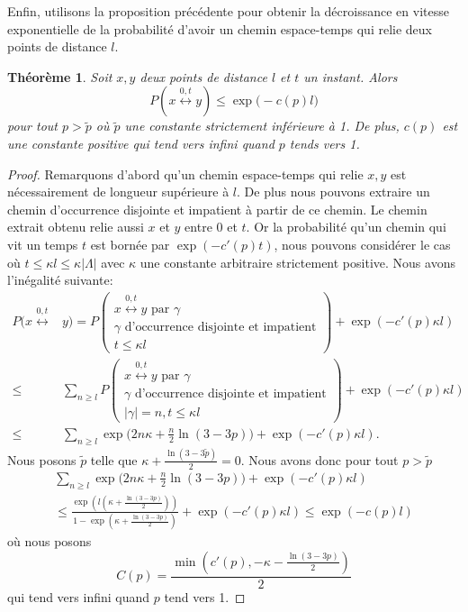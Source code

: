 \documentclass[titlepage,a4paper,12pt]{article}
\newcounter{d}
\newcounter{t}
\newcounter{p}
\newcounter{c}
\newcounter{a}
\newcounter{l}
\newtheorem{thm}[t]{Théorème}
\begin{document}
Enfin, utilisons la proposition précédente pour obtenir la décroissance en vitesse exponentielle de la probabilité d'avoir un chemin espace-temps qui relie deux points de distance $l$.
\begin{thm} Soit $x,y$ deux points de distance $l$ et $t$ un instant. Alors 
$$P(x\overset{0,t}{\longleftrightarrow} y)\leqslant \exp\big(-c(p)l\big)
$$pour tout $p > \tilde{p}$ où $\tilde{p}$ une constante strictement inférieure à 1. De plus, $c(p)$ est une constante positive qui tend vers infini quand $p$ tends vers 1.
\end{thm}
\begin{proof}
Remarquons d'abord qu'un chemin espace-temps qui relie $x,y$ est nécessairement de longueur supérieure à $l$. De plus nous pouvons extraire un chemin d'occurrence disjointe et impatient à partir de ce chemin. Le chemin extrait obtenu relie aussi $x$ et $y$ entre $0$ et $t$. Or la probabilité qu'un chemin qui vit un temps $t$ est bornée par $\exp(-c'(p)t)$, nous pouvons considérer le cas où $t\leqslant \kappa l \leqslant \kappa |\Lambda|$ avec $\kappa$ une constante arbitraire strictement positive.  Nous avons l'inégalité suivante:
\begin{align*}
P(x\overset{0,t}{\longleftrightarrow}& y)=P\left(\begin{array}{c}x\overset{0,t}{\longleftrightarrow} y\text{ par }\gamma\\\gamma \text{ d'occurrence disjointe et impatient}\\ t \leqslant \kappa l\end{array}\right) + \exp(-c'(p)\kappa l)\\
\leqslant& \sum_{n\geqslant l}P\left(\begin{array}{c}x\overset{0,t}{\longleftrightarrow} y\text{ par }\gamma\\\gamma \text{ d'occurrence disjointe et impatient}\\ |\gamma| = n, t \leqslant \kappa l\end{array}\right) + \exp(-c'(p)\kappa l)\\
\leqslant& \sum_{n\geqslant l} \exp\big(2n\kappa+\frac{n}{2}\ln(3-3p)\big) + \exp(-c'(p)\kappa l).
\end{align*}
Nous posons $\tilde{p}$ telle que $\kappa+\frac{\ln(3-3\tilde{p})}{2} = 0$. Nous avons donc pour tout $p>\tilde{p}$
\begin{multline*} \sum_{n\geqslant l} \exp\big(2n\kappa+\frac{n}{2}\ln(3-3p)\big) + \exp(-c'(p)\kappa l) \\
\leqslant \frac{\exp(l(\kappa+\frac{\ln(3-3p)}{2}))}{1-\exp(\kappa+\frac{\ln(3-3p)}{2})}+\exp(-c'(p)\kappa l)\leqslant \exp(-c(p)l)
\end{multline*}
où nous posons $$C(p) = \frac{\min(c'(p),-\kappa-\frac{\ln(3-3p)}{2})}{2}$$ qui tend vers infini quand $p$ tend vers 1.
\end{proof}
\end{document}
